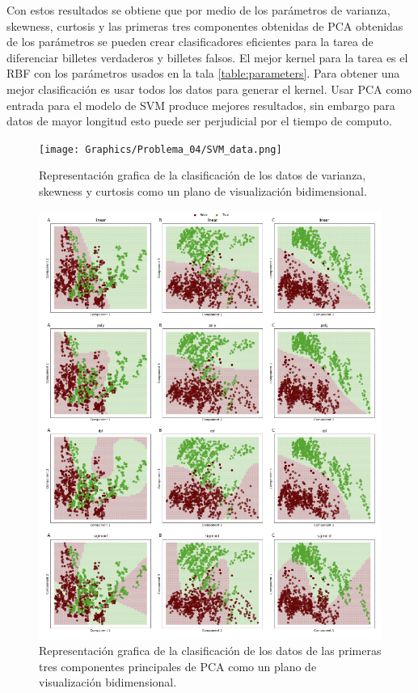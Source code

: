 Con estos resultados se obtiene que por medio de los parámetros de varianza, skewness, curtosis y las primeras tres componentes obtenidas de PCA obtenidas de los parámetros se pueden crear clasificadores eficientes para la tarea de diferenciar billetes verdaderos y billetes falsos. El mejor kernel para la tarea es el RBF con los parámetros usados en la tala \ref{table:parameters}. Para obtener una mejor clasificación es usar todos los datos para generar el kernel. Usar PCA como entrada para el modelo de SVM produce mejores resultados, sin embargo para datos de mayor longitud esto puede ser perjudicial por el tiempo de computo.

\pagebreak

\begin{figure}[H]
    \centering
    \texttt{[image: Graphics/Problema\_04/SVM\_data.png]}
    \caption{Representación grafica de la clasificación de los datos de varianza, skewness y curtosis como un plano de visualización bidimensional.}
    \label{fig:svm_data}
\end{figure}

\pagebreak

\begin{figure}[H]
    \centering
    \includegraphics[width=1\linewidth]{Graphics/Problema_04/SVM_PCA.png}
    \caption{Representación grafica de la clasificación de los datos de las primeras tres componentes principales de PCA como un plano de visualización bidimensional.}
    \label{fig:svm_pca}
\end{figure}